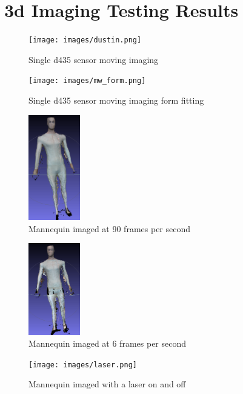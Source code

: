 \section{3d Imaging Testing Results}

\begin{figure}[h]
	\caption{Single d435 sensor moving imaging}
	\centering
	\texttt{[image: images/dustin.png]}
\end{figure}

\begin{figure}[h]
	\caption{Single d435 sensor moving imaging form fitting}
	\centering
	\texttt{[image: images/mw\_form.png]}
\end{figure}



\begin{figure}[h]
	\caption{Mannequin imaged at 90 frames per second}
	\centering
	\includegraphics[width=0.2\textwidth]{images/90fps_mannequin.png}
\end{figure}


\begin{figure}[h]
	\caption{Mannequin imaged at 6 frames per second}
	\centering
	\includegraphics[width=0.2\textwidth]{images/6fps_mannequin.png}
\end{figure}

\begin{figure}[h]
	\caption{Mannequin imaged with a laser on and off}
	\centering
	\texttt{[image: images/laser.png]}
\end{figure}


